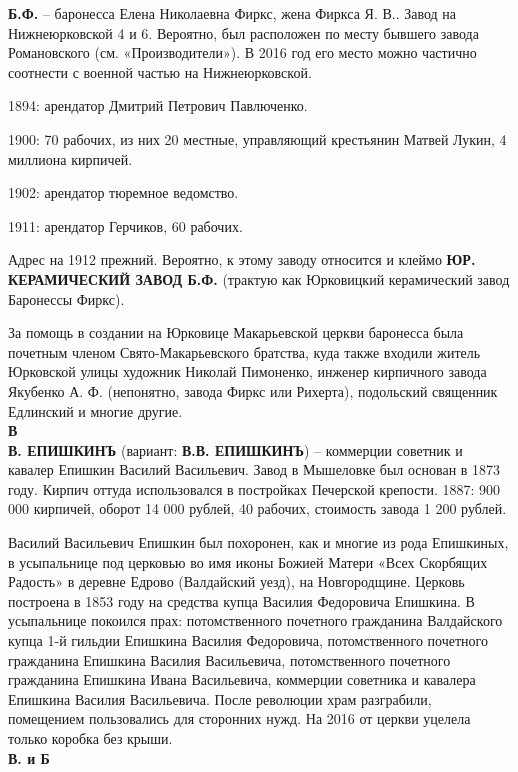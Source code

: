 \noindent\textbf{Б.Ф.} – баронесса Елена Николаевна Фиркс, жена Фиркса Я. В.. Завод на Нижнеюрковской 4 и 6. Вероятно, был расположен по месту бывшего завода Романовского (см. «Производители»). В 2016 год его место можно частично соотнести с военной частью на Нижнеюрковской. 

1894: арендатор  Дмитрий Петрович Павлюченко.

1900: 70 рабочих, из них 20 местные, управляющий крестьянин Матвей Лукин, 4 миллиона кирпичей. 

1902: арендатор тюремное ведомство.

1911: арендатор Герчиков, 60 рабочих. 

Адрес на 1912 прежний. Вероятно, к этому заводу относится и клеймо \textbf{ЮР. КЕРАМИЧЕСКИЙ ЗАВОД Б.Ф.} (трактую как Юрковицкий керамический завод Баронессы Фиркс).

За помощь в создании на Юрковице Макарьевской церкви баронесса была почетным членом Свято-Макарь\-евского братства, куда также входили житель Юрковской улицы художник Николай Пимоненко, инженер кирпичного завода Якубенко А. Ф. (непонятно, завода Фиркс или Рихерта), подольский священник Едлинский и многие другие.\\

\noindent\textbf{В}\\

\noindent\textbf{В. ЕПИШКИНЪ} (вариант: \textbf{В.В. ЕПИШКИНЪ}) – коммерции советник и кавалер Епишкин Василий Васильевич. Завод в Мышеловке был основан в 1873 году. Кирпич оттуда использовался в постройках Печерской крепости. 1887: 900 000 кирпичей, оборот 14 000 рублей, 40 рабочих, стоимость завода 1 200 рублей.

Василий Васильевич Епишкин был похоронен, как и многие из рода Епишкиных, в усыпальнице под церковью во имя иконы Божией Матери «Всех Скорбящих Радость» в деревне Едрово (Валдайский уезд), на Новгородщине. Церковь построена в 1853 году на средства купца Василия Федоровича Епишкина. В усыпальнице покоился прах: потомственного почетного гражданина Валдайского купца 1-й гильдии Епишкина Василия Федоровича, потомственного почетного гражданина Епишкина Василия Васильевича, потомственного почетного гражданина Епишкина Ивана Васильевича, коммерции советника и кавалера Епишкина Василия Васильевича. После революции храм разграбили, помещением пользовались для сторонних нужд. На 2016 от церкви уцелела только коробка без крыши.\\

\noindent\textbf{В. и Б}\\

